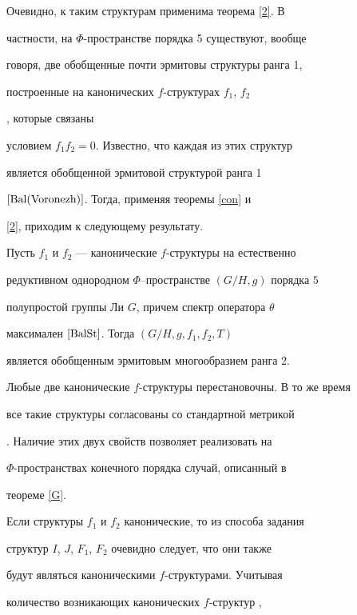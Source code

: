 Очевидно, к таким структурам применима теорема \ref{2}. В


частности, на $\Phi$-пространстве порядка 5 существуют, вообще


говоря, две обобщенные почти эрмитовы структуры ранга 1,


построенные на канонических $f$-структурах $f_1$, $f_2$


\cite{BalSt}, которые связаны 


условием $f_1f_2=0$. Известно, что каждая из этих структур


является обобщенной эрмитовой структурой ранга 1


$\cite{Bal(Voronezh)}$. Тогда, применяя теоремы \ref{con} и


\ref{2}, приходим к следующему результату.





\begin{thm}


Пусть $f_1$ и $f_2$ --- канонические $f$-структуры на естественно


редуктивном однородном $\Phi$--пространстве $(G/H, g)$ порядка $5$


полупростой группы Ли $G$, причем спектр оператора $\theta$


максимален $\cite{BalSt}$. Тогда $(G/H, g, f_1, f_2, T)$


является обобщенным эрмитовым многообразием ранга $2$.


\end{thm}





Любые две канонические $f$-структуры перестановочны. В то же время


все такие структуры согласованы со стандартной метрикой


\cite{Bal}. Наличие этих двух свойств позволяет реализовать на


$\Phi$-пространствах конечного порядка случай, описанный в


теореме \ref{G}.





Если структуры $f_1$ и $f_2$ канонические, то из способа задания


структур $I$, $J$, $F_1$, $F_2$ очевидно следует, что они также


будут являться каноническими $f$-структурами. Учитывая


количество возникающих канонических $f$-структур \cite{BalSt},


